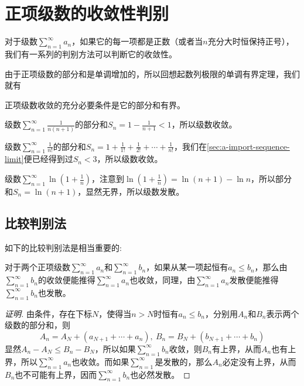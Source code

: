 
\section{正项级数的收敛性判别}
\label{sec:positive-number-series}

对于级数$\sum_{n=1}^{\infty}a_n$，如果它的每一项都是正数（或者当$n$充分大时恒保持正号），我们有一系列的判别方法可以判断它的收敛性。

由于正项级数的部分和是单调增加的，所以回想起数列极限的单调有界定理，我们就有

\begin{theorem}
  正项级数收敛的充分必要条件是它的部分和有界。
\end{theorem}

\begin{example}
  级数$\sum_{n=1}^{\infty}\frac{1}{n(n+1)}$的部分和$S_n=1-\frac{1}{n+1}<1$，所以级数收敛。
\end{example}

\begin{example}
  级数$\sum_{n=1}^{\infty}\frac{1}{n!}$的部分和$S_n=1+\frac{1}{1!}+\frac{1}{2!}+\cdots+\frac{1}{n!}$，我们在\autoref{sec:a-import-sequence-limit}便已经得到过$S_n<3$，所以级数收敛。
\end{example}

\begin{example}
  \label{example:series-ln-1-plus-1-over-n-converage}
  级数$\sum_{n=1}^{\infty}\ln{\left( 1+\frac{1}{n} \right)}$，注意到$\ln{\left( 1+\frac{1}{n} \right)} = \ln{(n+1)}-\ln{n}$，所以部分和$S_n=\ln{(n+1)}$，显然无界，所以级数发散。
\end{example}

\subsection{比较判别法}
\label{sec:compare-method-aboud-series-converage}

如下的比较判别法是相当重要的:
\begin{theorem}[比较判别法]
  \label{theorem:comparison-method-about-series-converage}
  对于两个正项级数$\sum_{n=1}^{\infty}a_n$和$\sum_{n=1}^{\infty}b_n$，如果从某一项起恒有$a_n \leqslant b_n$，那么由$\sum_{n=1}^{\infty}b_n$的收敛便能推得$\sum_{n=1}^{\infty}a_n$也收敛，同理，由$\sum_{n=1}^{\infty}a_n$发散便能推得$\sum_{n=1}^{\infty}b_n$也发散。
\end{theorem}

\begin{proof}[证明]
  由条件，存在下标$N$，使得当$n>N$时恒有$a_n \leqslant b_n$，分别用$A_n$和$B_n$表示两个级数的部分和，则
  \[ A_n = A_N + (a_{N+1}+\cdots+a_n), \  B_n=B_N+(b_{N+1}+\cdots+b_n) \]
  显然$A_n - A_N \leqslant B_n-B_N$，所以如果$\sum_{n=1}^{\infty}b_n$收敛，则$B_n$有上界，从而$A_n$也有上界，所以$\sum_{n=1}^{\infty}a_n$也收敛。而如果$\sum_{n=1}^{\infty}$是发散的，那么$A_n$必定没有上界，从而$B_n$也不可能有上界，因而$\sum_{n=1}^{\infty}b_n$也必然发散。
\end{proof}

